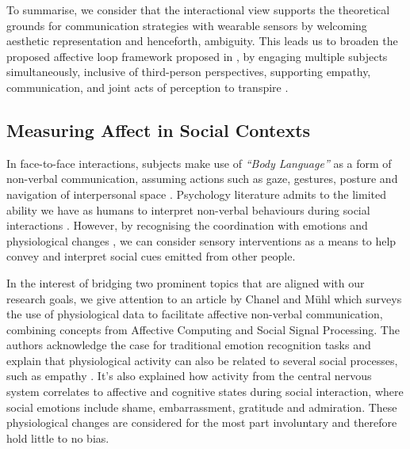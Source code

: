 
To summarise, we consider that the interactional view supports the theoretical grounds for communication strategies with wearable sensors by welcoming aesthetic representation and henceforth, ambiguity. This leads us to broaden the proposed affective loop framework proposed in \cite{hook_affective_2009}, by engaging multiple subjects simultaneously, inclusive of third-person perspectives, supporting empathy, communication, and joint acts of perception to transpire \cite{turmo_vidal_designing_2021,francoise_designing_2017}.

\subsection*{Measuring Affect in Social Contexts}
\label{lit_reivew:ssp}
In face-to-face interactions, subjects make use of \textit{``Body Language''} as a form of non-verbal communication, assuming actions such as gaze, gestures, posture and navigation of interpersonal space \cite{dobre_immersive_2022}. Psychology literature admits to the limited ability we have as humans to interpret non-verbal behaviours during social interactions \cite{joseph_emotional_2010}. However, by recognising the coordination with emotions and physiological changes \cite{mayer_human_2008}, we can consider sensory interventions as a means to help convey and interpret social cues emitted from other people.

In the interest of bridging two prominent topics that are aligned with our research goals, we give attention to an article by Chanel and Mühl \cite{chanel_connecting_2015} which surveys the use of physiological data to facilitate affective non-verbal communication, combining concepts from Affective Computing and Social Signal Processing. The authors acknowledge the case for traditional emotion recognition tasks and explain that physiological activity can also be related to several social processes, such as empathy \cite{levenson_empathy_1992}. It's also explained how activity from the central nervous system correlates to affective and cognitive states during social interaction, where social emotions include shame, embarrassment, gratitude and admiration. These physiological changes are considered for the most part involuntary and therefore hold little to no bias.


